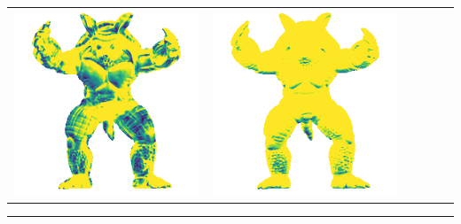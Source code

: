 \begin{center}
\begin{tabularx}{\linewidth}{@{}Y@{}Y@{}Y@{}Y@{}Y@{}Y@{}}
\includegraphics[width=\linewidth]{semisynthetic/20160617_22_marrnet_err.png} &
\includegraphics[width=\linewidth]{semisynthetic/20160617_22_ef_err.png} \\
\end{tabularx}
\begin{center}\rule{0.5\linewidth}{\linethickness}\end{center}

\end{center}

